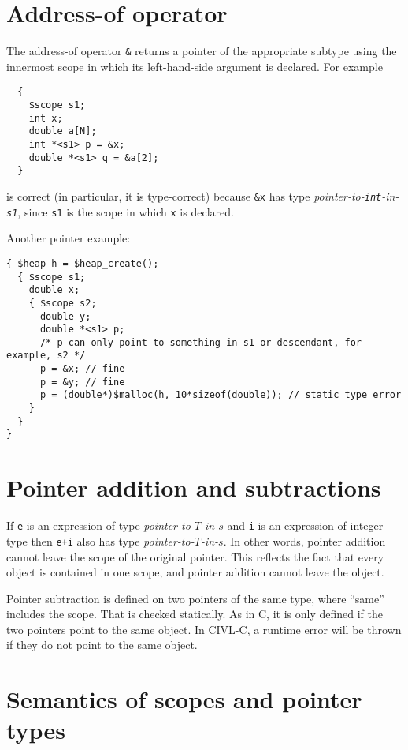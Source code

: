 \section{Address-of operator}

The address-of operator \texttt{\&} returns a pointer of the
appropriate subtype using the innermost scope in which its left-hand-side
argument is declared.  For example

\begin{verbatim}
  {
    $scope s1;
    int x;
    double a[N];
    int *<s1> p = &x;
    double *<s1> q = &a[2];
  }
\end{verbatim}
is correct (in particular, it is type-correct) because \texttt{\&x}
has type \emph{pointer-to-\texttt{int}-in-\texttt{s1}}, since
\texttt{s1} is the scope in which \texttt{x} is declared.

Another pointer example:
\begin{small}
\begin{verbatim}
{ $heap h = $heap_create();
  { $scope s1;
    double x;
    { $scope s2;
      double y;
      double *<s1> p;
      /* p can only point to something in s1 or descendant, for example, s2 */
      p = &x; // fine
      p = &y; // fine
      p = (double*)$malloc(h, 10*sizeof(double)); // static type error
    }
  }
}
\end{verbatim}
\end{small}

\section{Pointer addition and subtractions}

If \texttt{e} is an expression of type \emph{pointer-to-$T$-in-$s$}
and \texttt{i} is an expression of integer type then \texttt{e+i} also
has type \emph{pointer-to-$T$-in-$s$}.  In other words, pointer
addition cannot leave the scope of the original pointer.  This
reflects the fact that every object is contained in one scope, and
pointer addition cannot leave the object.

Pointer subtraction is defined on two pointers of the same type, where
``same'' includes the scope.  That is checked statically.  As in C, it
is only defined if the two pointers point to the same object.  In
CIVL-C, a runtime error will be thrown if they do not point to the
same object.

\section{Semantics of scopes and pointer types}

